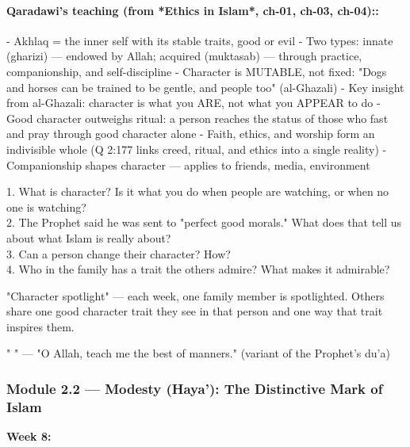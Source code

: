 \documentclass[11pt,a4paper]{article}
\begin{document}
\paragraph*{Qaradawi's teaching (from *Ethics in Islam*, ch-01, ch-03, ch-04)::}  - Akhlaq = the inner self with its stable traits, good or evil - Two types: innate (gharizi) --- endowed by Allah; acquired (muktasab) --- through practice, companionship, and self-discipline - Character is MUTABLE, not fixed: "Dogs and horses can be trained to be gentle, and people too" (al-Ghazali) - Key insight from al-Ghazali: character is what you ARE, not what you APPEAR to do - Good character outweighs ritual: a person reaches the status of those who fast and pray through good character alone - Faith, ethics, and worship form an indivisible whole (Q 2:177 links creed, ritual, and ethics into a single reality) - Companionship shapes character --- applies to friends, media, environment

\begin{discussionbox} 1. What is character? Is it what you do when people are watching, or when no one is watching? \\ 2. The Prophet said he was sent to "perfect good morals." What does that tell us about what Islam is really about? \\ 3. Can a person change their character? How? \\ 4. Who in the family has a trait the others admire? What makes it admirable? \end{discussionbox}

\begin{activitybox} "Character spotlight" --- each week, one family member is spotlighted. Others share one good character trait they see in that person and one way that trait inspires them. \end{activitybox}

\begin{duabox} "   " --- "O Allah, teach me the best of manners." (variant of the Prophet's du'a) \end{duabox}

\vspace{6pt}\noindent{\color{border}\rule{\textwidth}{0.5pt}}\vspace{6pt}

\subsubsection*{Module 2.2 --- Modesty (Haya'): The Distinctive Mark of Islam}
\textbf{Week 8:} 
\end{document}
